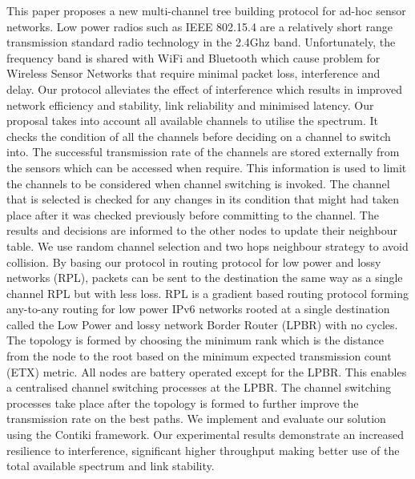 This paper proposes a new multi-channel tree building protocol for ad-hoc sensor networks. Low power radios such as IEEE 802.15.4 are a relatively short range transmission standard radio technology in the 2.4Ghz band. Unfortunately, the frequency band is shared with WiFi and Bluetooth which cause problem for Wireless Sensor Networks that require minimal packet loss, interference and delay. Our protocol alleviates the effect of interference which results in improved network efficiency and stability, link reliability and minimised latency. 
        Our proposal takes into account all available channels to utilise the spectrum. It checks the condition of all the channels before deciding on a channel to switch into. The successful transmission rate of the channels are stored externally from the sensors which can be accessed when require. This information is used to limit the channels to be considered when channel switching is invoked. The channel that is selected is checked for any changes in its condition that might had taken place after it was checked previously before committing to the channel. The results and decisions are informed to the other nodes to update their neighbour table. We use random channel selection and two hops neighbour strategy to avoid collision. 
	By basing our protocol in routing protocol for low power and lossy networks (RPL),  packets can be sent to the destination the same way as a single channel RPL but with less loss. RPL is a gradient based routing protocol forming any-to-any routing for low power IPv6 networks rooted at a single destination called the Low Power and lossy network Border Router (LPBR) with no cycles. The topology is formed by choosing the minimum rank which is the distance from the node to the root based on the minimum expected transmission count (ETX) metric. All nodes are battery operated except for the LPBR. This enables a centralised channel switching processes at the LPBR. The channel switching processes take place after the topology is formed to further improve the transmission rate on the best paths.
	We implement and evaluate our solution using the Contiki framework. Our experimental results demonstrate an increased resilience to interference, significant higher throughput making better use of the total available spectrum and link stability. 
